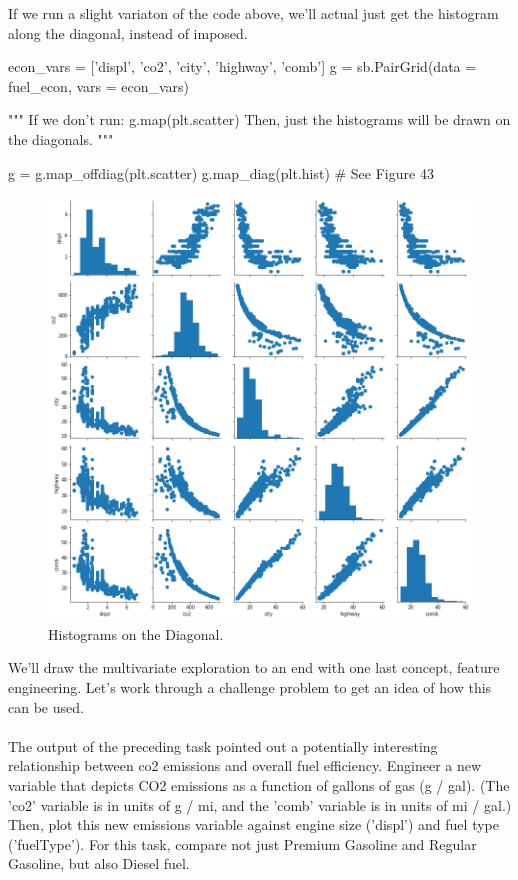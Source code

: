 If we run a slight variaton of the code above, we'll actual just get the histogram along the diagonal, instead of imposed.

\begin{python}
	econ_vars = ['displ', 'co2', 'city', 'highway', 'comb']
	g = sb.PairGrid(data = fuel_econ, vars = econ_vars)
	
	"""
	If we don't run:
	g.map(plt.scatter)
	Then, just the histograms will be drawn on the diagonals.
	"""
	
	g = g.map_offdiag(plt.scatter)
	g.map_diag(plt.hist)
	# See Figure 43
\end{python}

\begin{figure}
	\includegraphics[width=\textwidth,height=\textheight,keepaspectratio]{images/figure43.png}
	\caption{Histograms on the Diagonal.}\label{fig:figure43}
\end{figure}

We'll draw the multivariate exploration to an end with one last concept, feature engineering. Let's work through a challenge problem to get an idea of how this can be used.
\\\\

The output of the preceding task pointed out a potentially interesting relationship between co2 emissions and overall fuel efficiency. Engineer a new variable that depicts CO2 emissions as a function of gallons of gas (g / gal). (The 'co2' variable is in units of g / mi, and the 'comb' variable is in units of mi / gal.) Then, plot this new emissions variable against engine size ('displ') and fuel type ('fuelType'). For this task, compare not just Premium Gasoline and Regular Gasoline, but also Diesel fuel.

